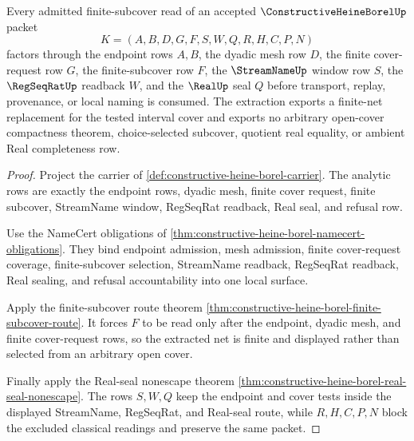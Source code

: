 \begin{theorem}
\label{thm:constructive-heine-borel-finite-net-extraction}
Every admitted finite-subcover read of an accepted $\ConstructiveHeineBorelUp$ packet
$$
K=(A,B,D,G,F,S,W,Q,R,H,C,P,N)
$$
factors through the endpoint rows $A,B$, the dyadic mesh row $D$, the finite cover-request row $G$, the finite-subcover row $F$, the $\StreamNameUp$ window row $S$, the $\RegSeqRatUp$ readback $W$, and the $\RealUp$ seal $Q$ before transport, replay, provenance, or local naming is consumed. The extraction exports a finite-net replacement for the tested interval cover and exports no arbitrary open-cover compactness theorem, choice-selected subcover, quotient real equality, or ambient Real completeness row.
\end{theorem}
\begin{proof}
Project the carrier of \autoref{def:constructive-heine-borel-carrier}. The analytic rows are exactly the endpoint rows, dyadic mesh, finite cover request, finite subcover, StreamName window, RegSeqRat readback, Real seal, and refusal row.

Use the NameCert obligations of \autoref{thm:constructive-heine-borel-namecert-obligations}. They bind endpoint admission, mesh admission, finite cover-request coverage, finite-subcover selection, StreamName readback, RegSeqRat readback, Real sealing, and refusal accountability into one local surface.

Apply the finite-subcover route theorem \autoref{thm:constructive-heine-borel-finite-subcover-route}. It forces $F$ to be read only after the endpoint, dyadic mesh, and finite cover-request rows, so the extracted net is finite and displayed rather than selected from an arbitrary open cover.

Finally apply the Real-seal nonescape theorem \autoref{thm:constructive-heine-borel-real-seal-nonescape}. The rows $S,W,Q$ keep the endpoint and cover tests inside the displayed StreamName, RegSeqRat, and Real-seal route, while $R,H,C,P,N$ block the excluded classical readings and preserve the same packet.
\end{proof}



